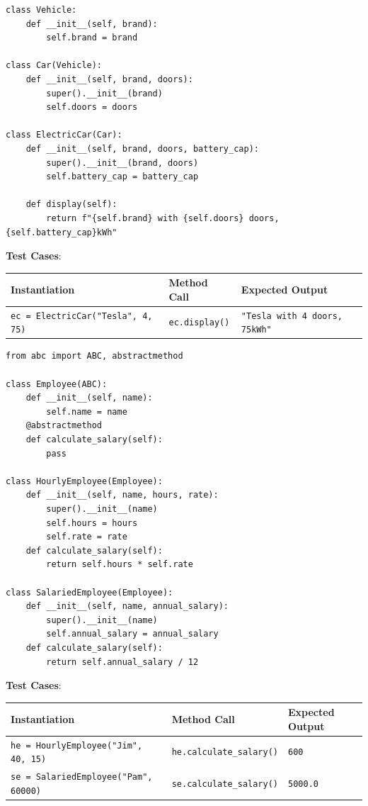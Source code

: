 \begin{solutionbox}
\begin{lstlisting}[language=Python3]
class Vehicle:
    def __init__(self, brand):
        self.brand = brand

class Car(Vehicle):
    def __init__(self, brand, doors):
        super().__init__(brand)
        self.doors = doors

class ElectricCar(Car):
    def __init__(self, brand, doors, battery_cap):
        super().__init__(brand, doors)
        self.battery_cap = battery_cap
        
    def display(self):
        return f"{self.brand} with {self.doors} doors, {self.battery_cap}kWh"
\end{lstlisting}
\textbf{Test Cases}:
\begin{tabular}{|l|l|l|}
\hline
\textbf{Instantiation} & \textbf{Method Call} & \textbf{Expected Output} \\ \hline
\texttt{ec = ElectricCar("Tesla", 4, 75)} & \texttt{ec.display()} & \texttt{"Tesla with 4 doors, 75kWh"} \\ \hline
\end{tabular}
\end{solutionbox}

\begin{solutionbox}
\begin{lstlisting}[language=Python3]
from abc import ABC, abstractmethod

class Employee(ABC):
    def __init__(self, name):
        self.name = name
    @abstractmethod
    def calculate_salary(self):
        pass

class HourlyEmployee(Employee):
    def __init__(self, name, hours, rate):
        super().__init__(name)
        self.hours = hours
        self.rate = rate
    def calculate_salary(self):
        return self.hours * self.rate

class SalariedEmployee(Employee):
    def __init__(self, name, annual_salary):
        super().__init__(name)
        self.annual_salary = annual_salary
    def calculate_salary(self):
        return self.annual_salary / 12
\end{lstlisting}
\textbf{Test Cases}:
\begin{tabular}{|l|l|l|}
\hline
\textbf{Instantiation} & \textbf{Method Call} & \textbf{Expected Output} \\ \hline
\texttt{he = HourlyEmployee("Jim", 40, 15)} & \texttt{he.calculate\_salary()} & \texttt{600} \\ \hline
\texttt{se = SalariedEmployee("Pam", 60000)} & \texttt{se.calculate\_salary()} & \texttt{5000.0} \\ \hline
\end{tabular}
\end{solutionbox}

